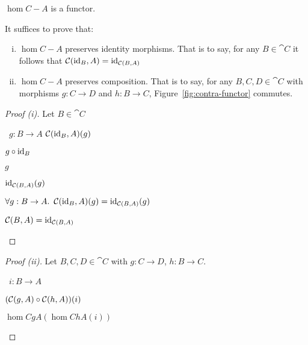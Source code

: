 \begin{prop}
  $\hom{C}{-}{A}$ is a functor.

  It suffices to prove that:
  \begin{enumerate}[(i)]
    \item $\hom{C}{-}{A}$ preserves identity morphisms. That is to say, for any $B\in\cat{C}$ it follows that $\mathcal{C}(\operatorname{id}_B, A) = \operatorname{id}_{\mathcal{C}(B, A)}$
    \item $\hom{C}{-}{A}$ preserves composition. That is to say, for any $B,C,D\in\cat{C}$ with morphisms $g : C \to D$
      and $h : B \to C$, Figure~\ref{fig:contra-functor} commutes.
  \end{enumerate}

  \begin{proof}[Proof (i)]
    Let $B\in\cat{C}$
    \begin{itemize}
      \step
        \begin{itemize}
          \subp{\star}
            \Let~$g : B \to A$
            \marginnote{\Hyp}
          \step
            $\mathcal{C}(\operatorname{id}_B, A)(g)$

          \step[=]
            $g\circ\operatorname{id}_B$
            \marginnote{\Def-\ref{def:contra-hom}}

          \step[=]
            $g$
            \marginnote{\Def-$\id$}

          \step[=]
            $\operatorname{id}_{\mathcal{C}(B, A)}(g)$
            \marginnote{\Def-$\id$}
        \end{itemize}

      \step[\imps]
        $\forall g : B \to A\ldotp~\mathcal{C}(\operatorname{id}_B, A)(g) = \operatorname{id}_{\mathcal{C}(B, A)}(g)$
        \marginnote{$\forall$-\Intro}

      \step[\iffs]
        $\mathcal{C}(B, A) = \operatorname{id}_{\mathcal{C}(B, A)}$
        \marginnote{\Def-=}
        \qedhere
    \end{itemize}
  \end{proof}

  \begin{proof}[Proof (ii)]
    Let $B, C, D\in\cat{C}$ with ${g : C\to D}$, ${h : B\to C}$.
    \begin{itemize}
      \step
        \begin{itemize}
          \subp{\star} \Let~$i : B\to A$
            \marginnote{\Hyp}

          \step
            $(\mathcal{C}(g, A)\circ\mathcal{C}(h, A))(i)$

          \step[=] $\hom{C}{g}{A}(\hom{C}{h}{A}(i))$
            \marginnote{\Def-$\compose$}


\end{itemize}
\end{itemize}
\end{proof}
\end{prop}
